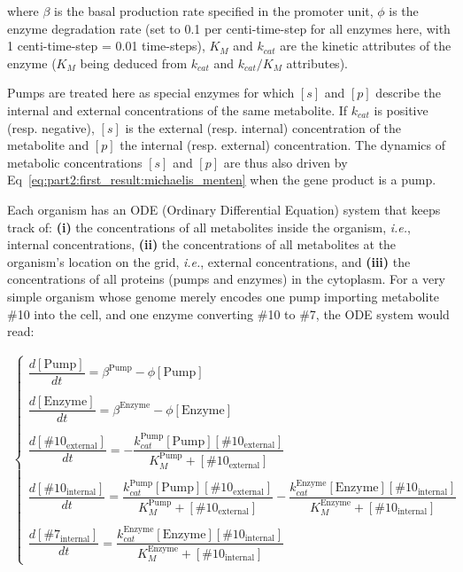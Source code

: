 where $\beta$ is the basal production rate specified in the promoter unit, $\phi$ is the enzyme degradation rate (set to 0.1 per centi-time-step for all enzymes here, with 1 centi-time-step = 0.01 time-steps), $K_M$ and $k_{cat}$ are the kinetic attributes of the enzyme ($K_M$ being deduced from $k_{cat}$ and $k_{cat}/K_M$ attributes).

Pumps are treated here as special enzymes for which $[s]$ and $[p]$ describe the internal and external concentrations of the same metabolite. If $k_{cat}$ is positive (resp. negative), $[s]$ is the external (resp. internal) concentration of the metabolite and $[p]$ the internal (resp. external) concentration. The dynamics of metabolic concentrations $[s]$ and $[p]$ are thus also driven by Eq~\ref{eq:part2:first_result:michaelis_menten} when the gene product is a pump.

Each organism has an ODE (Ordinary Differential Equation) system that keeps track of: \textbf{(i)} the concentrations of all metabolites inside the organism, \textit{i.e.}, internal concentrations, \textbf{(ii)} the concentrations of all metabolites at the organism's location on the grid, \textit{i.e.}, external concentrations, and \textbf{(iii)} the concentrations of all proteins (pumps and enzymes) in the cytoplasm. For a very simple organism whose genome merely encodes one pump importing metabolite \#10 into the cell, and one enzyme converting \#10 to \#7, the ODE system would read:

\begin{eqnarray}
\left\{
\begin{array}{lcr}
\dfrac{d[\text{Pump}]}{dt} = \beta^{\text{Pump}} - \phi[\text{Pump}]\\\\
\dfrac{d[\text{Enzyme}]}{dt} = \beta^{\text{Enzyme}} - \phi[\text{Enzyme}]\\\\
\dfrac{d[\#10_{\text{external}}]}{dt} = -\dfrac{k_{cat}^{\text{Pump}}[\text{Pump}][\#10_{\text{external}}]}{K_M^{\text{Pump}}+[\#10_{\text{external}}]}\\\\
\dfrac{d[\#10_{\text{internal}}]}{dt} = \dfrac{k_{cat}^{\text{Pump}}[\text{Pump}][\#10_{\text{external}}]}{K_M^{\text{Pump}}+[\#10_{\text{external}}]} - \dfrac{k_{cat}^{\text{Enzyme}}[\text{Enzyme}][\#10_{\text{internal}}]}{K_M^{\text{Enzyme}}+[\#10_{\text{internal}}]}\\\\
\dfrac{d[\#7_{\text{internal}}]}{dt} = \dfrac{k_{cat}^{\text{Enzyme}}[\text{Enzyme}][\#10_{\text{internal}}]}{K_M^{\text{Enzyme}}+[\#10_{\text{internal}}]}
\end{array}
\right.
\end{eqnarray}

